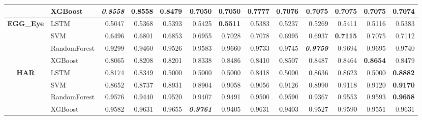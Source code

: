 \begin{table}[H]
\begin{adjustbox}{max width=14cm}
\begin{tabular}{|c|l|r|r|r|r|r|r|r|r|r|r|r|}
			                      & XGBoost      & \textit{\textbf{0.8558}} & 0.8558                   & 0.8479          & 0.7050                   & 0.7050          & 0.7777 & 0.7076          & 0.7075                   & 0.7075                   & 0.7075          & 0.7074          \\
			\hline
			\textbf{EGG\_Eye}     & LSTM         & 0.5047                   & 0.5368                   & 0.5393          & 0.5425                   & \textbf{0.5511} & 0.5383 & 0.5237          & 0.5269                   & 0.5411                   & 0.5116          & 0.5383          \\
			                      & SVM          & 0.6496                   & 0.6801                   & 0.6853          & 0.6955                   & 0.7028          & 0.7078 & 0.6995          & 0.6937                   & \textbf{0.7115}          & 0.7075          & 0.7112          \\
			                      & RandomForest & 0.9299                   & 0.9460                   & 0.9526          & 0.9583                   & 0.9660          & 0.9733 & 0.9745          & \textit{\textbf{0.9759}} & 0.9694                   & 0.9695          & 0.9740          \\
			                      & XGBoost      & 0.8065                   & 0.8208                   & 0.8201          & 0.8338                   & 0.8486          & 0.8410 & 0.8507          & 0.8487                   & 0.8464                   & \textbf{0.8654} & 0.8479          \\
			\hline
			\textbf{HAR}          & LSTM         & 0.8174                   & 0.8349                   & 0.5000          & 0.5000                   & 0.5000          & 0.8418 & 0.5000          & 0.8636                   & 0.8623                   & 0.5000          & \textbf{0.8882} \\
			                      & SVM          & 0.8652                   & 0.8737                   & 0.8931          & 0.8904                   & 0.9058          & 0.9056 & 0.9126          & 0.8990                   & 0.9118                   & 0.9120          & \textbf{0.9170} \\
			                      & RandomForest & 0.9576                   & 0.9440                   & 0.9520          & 0.9407                   & 0.9491          & 0.9500 & 0.9590          & 0.9367                   & 0.9553                   & 0.9593          & \textbf{0.9658} \\
			                      & XGBoost      & 0.9582                   & 0.9631                   & 0.9655          & \textit{\textbf{0.9761}} & 0.9405          & 0.9631 & 0.9403          & 0.9527                   & 0.9590                   & 0.9551          & 0.9631          \\

\end{tabular}
\end{adjustbox}
\end{table}
